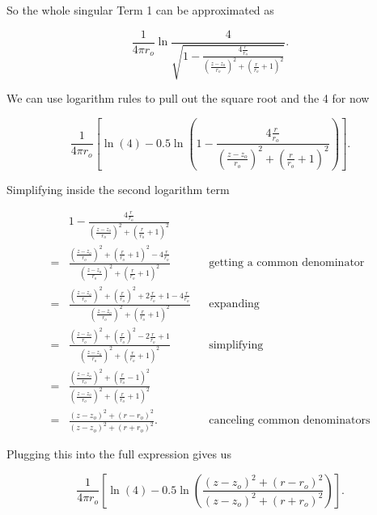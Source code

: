 \noindent So the whole singular Term 1 can be approximated as

\begin{equation}
\frac{1}{4\pi r_o} \ln \frac{4}{\sqrt{1-\frac{4\frac{r}{r_o}}{\left(\frac{z-z_o}{r_o}\right)^2 + \left(\frac{r}{r_o}+1\right)^2}}}.
\end{equation}

\noindent We can use logarithm rules to pull out the square root and the 4 for now

\begin{equation}
\frac{1}{4\pi r_o} \left[\ln(4) - 0.5 \ln\left(1-\frac{4\frac{r}{r_o}}{\left(\frac{z-z_o}{r_o}\right)^2 + \left(\frac{r}{r_o}+1\right)^2}\right)\right].
\end{equation}

\noindent Simplifying inside the second logarithm term

\begin{equation}
\begin{aligned}
& 1-\frac{4\frac{r}{r_o}}{\left(\frac{z-z_o}{r_o}\right)^2 + \left(\frac{r}{r_o}+1\right)^2} \\
%
    =& \frac{{\left(\frac{z-z_o}{r_o}\right)^2 + \left(\frac{r}{r_o}+1\right)^2}-4\frac{r}{r_o}}{\left(\frac{z-z_o}{r_o}\right)^2 + \left(\frac{r}{r_o}+1\right)^2} && \text{getting a common denominator}\\
%
    =& \frac{\left(\frac{z-z_o}{r_o}\right)^2 + \left(\frac{r}{r_o}\right)^2+2\frac{r}{r_o}+1-4\frac{r}{r_o}}{\left(\frac{z-z_o}{r_o}\right)^2 + \left(\frac{r}{r_o}+1\right)^2} && \text{expanding} \\
%
    =& \frac{\left(\frac{z-z_o}{r_o}\right)^2 + \left(\frac{r}{r_o}\right)^2-2\frac{r}{r_o}+1}{\left(\frac{z-z_o}{r_o}\right)^2 + \left(\frac{r}{r_o}+1\right)^2} && \text{simplifying}\\
%
=& \frac{\left(\frac{z-z_o}{r_o}\right)^2 + \left(\frac{r}{r_o}-1\right)^2}{\left(\frac{z-z_o}{r_o}\right)^2 + \left(\frac{r}{r_o}+1\right)^2}\\
%
=& \frac{\left(z-z_o\right)^2 + \left(r-r_o\right)^2}{\left(z-z_o\right)^2 + \left(r+r_o\right)^2}. && \text{canceling common denominators}
\end{aligned}
\end{equation}

\noindent Plugging this into the full expression gives us

\begin{equation}
\frac{1}{4\pi r_o} \left[\ln(4) - 0.5 \ln\left(\frac{\left(z-z_o\right)^2 + \left(r-r_o\right)^2}{\left(z-z_o\right)^2 + \left(r+r_o\right)^2}\right)\right].
\end{equation}


